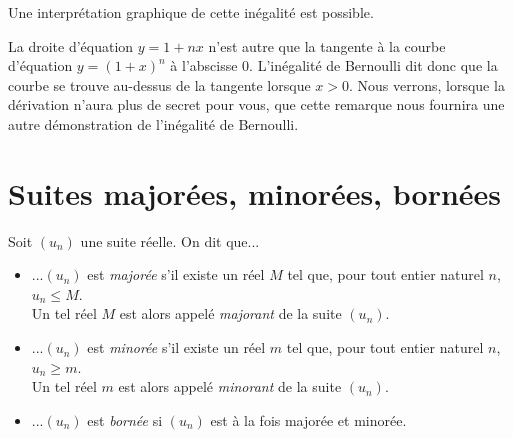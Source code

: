 \documentclass[11pt,fleqn]{book} %
\begin{document}
\begin{minipage}{0.3\linewidth}
\begin{center}
\end{center}\end{minipage}\hfill
\begin{minipage}{0.65\linewidth}
Une interprétation graphique de cette inégalité est possible.

La droite d'équation $y=1+nx$ n'est autre que la tangente à la courbe d'équation $y=(1+x)^n$ à l'abscisse 0. L'inégalité de Bernoulli dit donc que la courbe se trouve au-dessus de la tangente lorsque $x>0$.
\vskip5pt
Nous verrons, lorsque la dérivation n'aura plus de secret pour vous, que cette remarque nous fournira une autre démonstration de l'inégalité de Bernoulli.
\end{minipage}



\section{Suites majorées, minorées, bornées}

\begin{definition} Soit $(u_n)$ une suite réelle. On dit que...
\begin{itemize}
\item ...$(u_n)$ est \textit{majorée} s'il existe un réel $M$ tel que, pour tout entier naturel $n$, $u_n \leqslant M$.\\ Un tel réel $M$ est alors appelé \textit{majorant} de la suite $(u_n)$.
\item ...$(u_n)$ est \textit{minorée} s'il existe un réel $m$ tel que, pour tout entier naturel $n$, $u_n \geqslant m$.\\ Un tel réel $m$ est alors appelé \textit{minorant} de la suite $(u_n)$.
\item ...$(u_n)$ est \textit{bornée} si $(u_n)$ est à la fois majorée et minorée.
\end{itemize}\end{definition}
\end{document}
